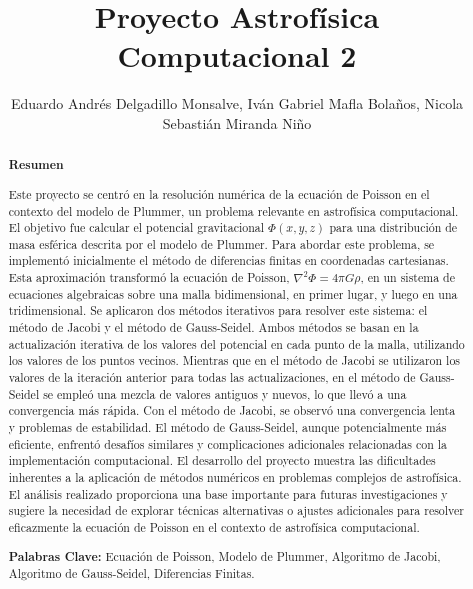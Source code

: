 \documentclass[reprint,amsmath,amssymb,aps]{revtex4-2}
\begin{document}
\footnotesize
{}

\title{Proyecto Astrofísica Computacional 2}

\author{\large Eduardo Andrés Delgadillo Monsalve, Iván Gabriel Mafla Bolaños, Nicola Sebastián Miranda Niño}
\begin{abstract}
\normalsize
\begin{center}\textbf{Resumen}\\
\end{center}
Este proyecto se centró en la resolución numérica de la ecuación de Poisson en el contexto del modelo de Plummer, un problema relevante en astrofísica computacional. El objetivo fue calcular el potencial gravitacional \(\Phi(x, y, z)\) para una distribución de masa esférica descrita por el modelo de Plummer. Para abordar este problema, se implementó inicialmente el método de diferencias finitas en coordenadas cartesianas. Esta aproximación transformó la ecuación de Poisson, \(\nabla^2 \Phi = 4\pi G\rho\), en un sistema de ecuaciones algebraicas sobre una malla bidimensional, en primer lugar, y luego en una tridimensional. Se aplicaron dos métodos iterativos para resolver este sistema: el método de Jacobi y el método de Gauss-Seidel. Ambos métodos se basan en la actualización iterativa de los valores del potencial en cada punto de la malla, utilizando los valores de los puntos vecinos. Mientras que en el método de Jacobi se utilizaron los valores de la iteración anterior para todas las actualizaciones, en el método de Gauss-Seidel se empleó una mezcla de valores antiguos y nuevos, lo que llevó a una convergencia más rápida. Con el método de Jacobi, se observó una convergencia lenta y problemas de estabilidad. El método de Gauss-Seidel, aunque potencialmente más eficiente, enfrentó desafíos similares y complicaciones adicionales relacionadas con la implementación computacional. El desarrollo del proyecto muestra las dificultades inherentes a la aplicación de métodos numéricos en problemas complejos de astrofísica. El análisis realizado proporciona una base importante para futuras investigaciones y sugiere la necesidad de explorar técnicas alternativas o ajustes adicionales para resolver eficazmente la ecuación de Poisson en el contexto de astrofísica computacional.
 
\textbf{Palabras Clave: } Ecuación de Poisson, Modelo de Plummer, Algoritmo de Jacobi, Algoritmo de Gauss-Seidel, Diferencias Finitas. 
\end{abstract}
\maketitle
\end{document}
